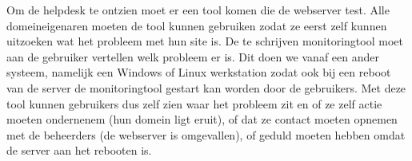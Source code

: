 Om de helpdesk te ontzien moet er een tool komen die de webserver test. Alle domeineigenaren moeten de tool kunnen gebruiken zodat ze eerst zelf kunnen uitzoeken wat het probleem met hun site is. De te schrijven monitoringtool moet aan de gebruiker vertellen welk probleem er is. Dit doen we vanaf een ander systeem, namelijk een Windows of Linux werkstation zodat ook bij een reboot van de server de monitoringtool gestart kan worden door de gebruikers. Met deze tool kunnen gebruikers dus zelf zien waar het probleem zit en of ze zelf actie moeten ondernenem (hun domein ligt eruit), of dat ze contact moeten opnemen met de beheerders (de webserver is omgevallen), of geduld moeten hebben omdat de server aan het rebooten is.

